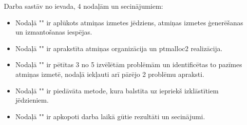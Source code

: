 Darba sastāv no ievada, 4 nodaļām un secinājumiem:
\begin{itemize}
    \item Nodaļā "{\@nodone}" ir aplūkots atmiņas izmetes jēdziens, atmiņas izmetes ģenerēšanas un izmantošanas iespējas.
    \item Nodaļā "{\@nodtwo}" ir aprakstīta atmiņas organizācija un  ptmalloc2 realizācija. 
    \item Nodaļā "{\@nodthree}" ir pētītas 3 no 5 izvēlētām problēmām un identificētas to pazīmes atmiņas izmetē, nodaļā iekļauti arī pārējo 2 problēmu apraksti.
    \item Nodaļā "{\@nodfour}" ir piedāvāta metode, kura balstīta uz iepriekš izklāstītiem jēdzieniem.
    \item Nodaļā "{\@nodsix}" ir apkopoti darba laikā gūtie rezultāti un secinājumi.
\end{itemize} 
